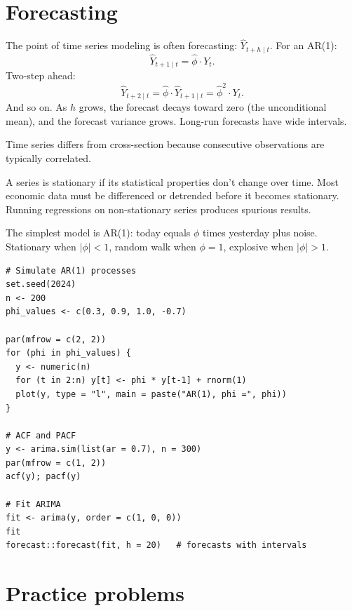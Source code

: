 \section{Forecasting}

The point of time series modeling is often forecasting: $\hat Y_{t+h \mid t}$. For an AR(1):
\[
  \hat Y_{t+1 \mid t} = \hat\phi \cdot Y_t.
\]
Two-step ahead:
\[
  \hat Y_{t+2 \mid t} = \hat\phi \cdot \hat Y_{t+1\mid t} = \hat\phi^2 \cdot Y_t.
\]
And so on. As $h$ grows, the forecast decays toward zero (the unconditional mean), and the forecast variance grows. Long-run forecasts have wide intervals.

\begin{keyinsight}
Time series differs from cross-section because consecutive observations are typically correlated.

A series is stationary if its statistical properties don't change over time. Most economic data must be differenced or detrended before it becomes stationary. Running regressions on non-stationary series produces spurious results.

The simplest model is AR(1): today equals $\phi$ times yesterday plus noise. Stationary when $|\phi| < 1$, random walk when $\phi = 1$, explosive when $|\phi| > 1$.
\end{keyinsight}

\begin{codelab}
\begin{lstlisting}[language=Rlang]
# Simulate AR(1) processes
set.seed(2024)
n <- 200
phi_values <- c(0.3, 0.9, 1.0, -0.7)

par(mfrow = c(2, 2))
for (phi in phi_values) {
  y <- numeric(n)
  for (t in 2:n) y[t] <- phi * y[t-1] + rnorm(1)
  plot(y, type = "l", main = paste("AR(1), phi =", phi))
}

# ACF and PACF
y <- arima.sim(list(ar = 0.7), n = 300)
par(mfrow = c(1, 2))
acf(y); pacf(y)

# Fit ARIMA
fit <- arima(y, order = c(1, 0, 0))
fit
forecast::forecast(fit, h = 20)   # forecasts with intervals
\end{lstlisting}
\end{codelab}

\section{Practice problems}

